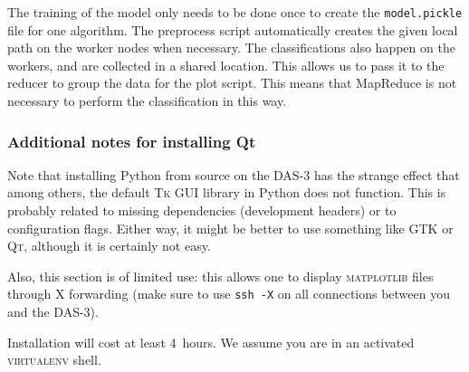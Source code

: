 \documentclass{article}
\begin{document}
The training of the model only needs to be done once to create the 
\texttt{model.pickle} file for one algorithm. The preprocess script 
automatically creates the given local path on the worker nodes when necessary. 
The classifications also happen on the workers, and are collected in a shared 
location. This allows us to pass it to the reducer to group the data for the 
plot script. This means that MapReduce is not necessary to perform the 
classification in this way.

\subsubsection{Additional notes for installing Qt}\label{app:qt}
Note that installing Python from source on the DAS-3 has the strange effect 
that among others, the default \textsc{Tk} GUI library in Python does not 
function. This is probably related to missing dependencies (development 
headers) or to configuration flags. Either way, it might be better to use 
something like GTK or \textsc{Qt}, although it is certainly not easy.

Also, this section is of limited use: this allows one to display 
\textsc{matplotlib} files through X forwarding (make sure to use \texttt{ssh 
-X} on all connections between you and the DAS-3).

Installation will cost at least 4~hours. We assume you are in an activated 
\textsc{virtualenv} shell.
\end{document}
